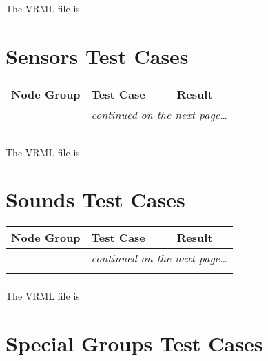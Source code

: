\documentclass[12pt,letterpaper]{article}
\newcounter{testCaseCtr}
\newcommand{\resetTestCase}{\setcounter{testCaseCtr}{1}}
\begin{document}
\subsubsection{}
The VRML file is 

\section{Sensors Test Cases}
\resetTestCase


\begin{center}
\setlongtables
\begin{longtable}{|l|l|l|}
\hline
\textbf{Node Group} & \textbf{Test Case} & \textbf{Result} \\
\hline\hline
\endhead
\cline{2-3}
 & \multicolumn{2}{|r|}{\textsl{continued on the next page\ldots}} \\
\hline
\endfoot
\hline
\endlastfoot
& & \\
\cline{2-3}
\end{longtable}
\end{center}

\subsubsection{}
The VRML file is 

\section{Sounds Test Cases}
\resetTestCase


\begin{center}
\setlongtables
\begin{longtable}{|l|l|l|}
\hline
\textbf{Node Group} & \textbf{Test Case} & \textbf{Result} \\
\hline\hline
\endhead
\cline{2-3}
 & \multicolumn{2}{|r|}{\textsl{continued on the next page\ldots}} \\
\hline
\endfoot
\hline
\endlastfoot
& & \\
\cline{2-3}
\end{longtable}
\end{center}

\subsubsection{}
The VRML file is 

\section{Special Groups Test Cases}
\resetTestCase
\end{document}
